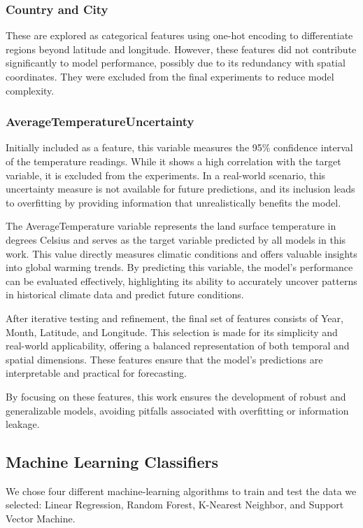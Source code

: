 \documentclass[conference]{IEEEtran}
\begin{document}
\subsubsection{Country and City}
These are explored as categorical features using one-hot encoding to differentiate regions beyond latitude and longitude. However, these features did not contribute significantly to model performance, possibly due to its redundancy with spatial coordinates. They were excluded from the final experiments to reduce model complexity.

\subsubsection{AverageTemperatureUncertainty}
Initially included as a feature, this variable measures the 95\% confidence interval of the temperature readings. While it shows a high correlation with the target variable, it is excluded from the experiments. In a real-world scenario, this uncertainty measure is not available for future predictions, and its inclusion leads to overfitting by providing information that unrealistically benefits the model.

The AverageTemperature variable represents the land surface temperature in degrees Celsius and serves as the target variable predicted by all models in this work. This value directly measures climatic conditions and offers valuable insights into global warming trends. By predicting this variable, the model’s performance can be evaluated effectively, highlighting its ability to accurately uncover patterns in historical climate data and predict future conditions.

After iterative testing and refinement, the final set of features consists of Year, Month, Latitude, and Longitude. This selection is made for its simplicity and real-world applicability, offering a balanced representation of both temporal and spatial dimensions. These features ensure that the model’s predictions are interpretable and practical for forecasting.

By focusing on these features, this work ensures the development of robust and generalizable models, avoiding pitfalls associated with overfitting or information leakage.

\subsection{Machine Learning Classifiers}
We chose four different machine-learning algorithms to train and test the data we selected: Linear Regression, Random Forest, K-Nearest Neighbor, and Support Vector Machine.  
\end{document}
